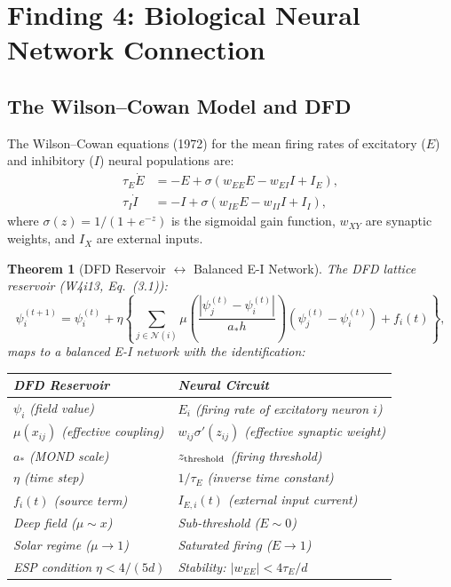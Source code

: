 \documentclass[11pt]{article}
\newtheorem{theorem}{Theorem}[section]
\theoremstyle{definition}
\theoremstyle{remark}
\begin{document}
\section{Finding 4: Biological Neural Network Connection}
\label{sec:biological-connection}

\subsection{The Wilson--Cowan Model and DFD}
\label{sec:wilson-cowan}

The Wilson--Cowan equations (1972) for the mean firing rates of excitatory
($E$) and inhibitory ($I$) neural populations are:
\begin{align}
  \tau_E \dot{E} &= -E + \sigma(w_{EE}E - w_{EI}I + I_E), \label{eq:wc-E} \\
  \tau_I \dot{I} &= -I + \sigma(w_{IE}E - w_{II}I + I_I), \label{eq:wc-I}
\end{align}
where $\sigma(z) = 1/(1+e^{-z})$ is the sigmoidal gain function,
$w_{XY}$ are synaptic weights, and $I_X$ are external inputs.

\begin{theorem}[DFD Reservoir $\leftrightarrow$ Balanced E-I Network]
\label{thm:dfd-ei}
The DFD lattice reservoir (W4i13, Eq.~(3.1)):
\begin{equation}
  \psi_i^{(t+1)} = \psi_i^{(t)} + \eta \left\{
  \sum_{j \in \mathcal{N}(i)} \mu\!\left(\frac{|\psi_j^{(t)} - \psi_i^{(t)}|}{a_* h}\right)
  (\psi_j^{(t)} - \psi_i^{(t)}) + f_i(t)\right\},
  \label{eq:dfd-reservoir-repeat}
\end{equation}
maps to a balanced E-I network with the identification:
\begin{center}
\begin{tabular}{@{}ll@{}}
\toprule
\textbf{DFD Reservoir} & \textbf{Neural Circuit} \\
\midrule
$\psi_i$ (field value) & $E_i$ (firing rate of excitatory neuron $i$) \\
$\mu(x_{ij})$ (effective coupling) & $w_{ij}\sigma'(z_{ij})$ (effective synaptic weight) \\
$a_*$ (MOND scale) & $z_{\rm threshold}$ (firing threshold) \\
$\eta$ (time step) & $1/\tau_E$ (inverse time constant) \\
$f_i(t)$ (source term) & $I_{E,i}(t)$ (external input current) \\
Deep field ($\mu \sim x$) & Sub-threshold ($E \sim 0$) \\
Solar regime ($\mu \to 1$) & Saturated firing ($E \to 1$) \\
ESP condition $\eta < 4/(5d)$ & Stability: $|w_{EE}| < 4\tau_E/d$ \\
\bottomrule
\end{tabular}
\end{center}
\end{theorem}
\end{document}
